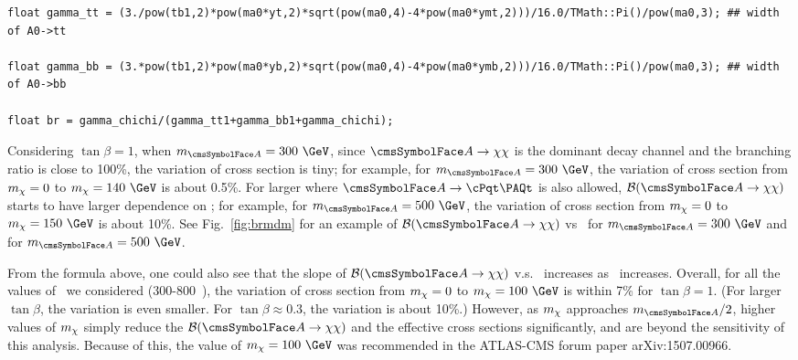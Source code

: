 \begin{enumerate}
\begin{tiny}
\begin{verbatim}
float gamma_tt = (3./pow(tb1,2)*pow(ma0*yt,2)*sqrt(pow(ma0,4)-4*pow(ma0*ymt,2)))/16.0/TMath::Pi()/pow(ma0,3); ## width of A0->tt 

float gamma_bb = (3.*pow(tb1,2)*pow(ma0*yb,2)*sqrt(pow(ma0,4)-4*pow(ma0*ymb,2)))/16.0/TMath::Pi()/pow(ma0,3); ## width of A0->bb 

float br = gamma_chichi/(gamma_tt1+gamma_bb1+gamma_chichi); 
\end{verbatim}
\end{tiny}
Considering $\tan\beta=1$, when $\maz=300~\GeV$, since $\Az\rightarrow \chi \chi$ is the dominant decay channel and the branching ratio is close to 
100\%, the variation of cross section is tiny; for example, for $\maz=300~\GeV$, the variation of cross section from $m_{\chi}=0$ to $\mdm=140~\GeV$ is 
about 0.5\%. For larger \maz where 
$\Az\rightarrow \PQt\PAQt$ is also allowed, ${\cal B}(\Az\rightarrow\chi\chi)$ starts to have larger dependence on \mdm; for example, for 
$\maz=500~\GeV$, the variation of cross section from $m_{\chi}=0$ to $\mdm=150~\GeV$ is about 10\%. 
See Fig.~\ref{fig:brmdm} for an example of ${\cal B}(\Az\rightarrow\chi\chi)$ vs \mdm\ for $\maz=300~\GeV$ and for $\maz=500~\GeV$. 

From the formula above, one could also see that the slope of ${\cal B}(\Az\rightarrow\chi\chi)$  v.s. \mdm\ increases as \mdm\ increases. Overall, 
for all the values of \maz\ we considered (300-800~\GeV), the variation of cross section from $m_{\chi}=0$ to $\mdm=100~\GeV$ is within 7\% for 
$\tan\beta=1$. (For larger $\tan\beta$, the variation is even smaller. For $\tan\beta\approx0.3$, the variation is about 10\%.) However, as $m_{\chi}$ 
approaches $\maz/2$, higher values of $m_{\chi}$ simply reduce the ${\cal B}(\Az\rightarrow\chi\chi)$ and the effective cross sections significantly, 
and are beyond the sensitivity of this analysis. 
Because of this, the value of $\mdm=100~\GeV$ was recommended in the ATLAS-CMS forum paper arXiv:1507.00966.



\end{enumerate}
